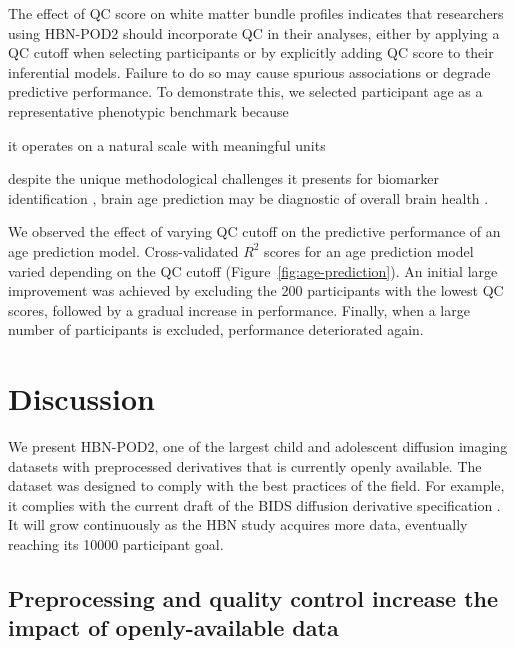 \documentclass[fleqn,10pt,inline]{wlscirep}
\begin{document}
The effect of QC score on white matter bundle profiles indicates that researchers
using HBN-POD2 should incorporate QC in their analyses, either by applying a QC cutoff
when selecting participants or by explicitly adding QC score to their inferential
models. Failure to do so may cause spurious associations or degrade predictive
performance. To demonstrate this, we selected participant age as a representative phenotypic benchmark because
\begin{enumerate*}[%
    label=(\roman*),%
    before=\unskip{ },%
    itemjoin={{, }},%
    itemjoin*={{ and }}]
    \item it operates on a natural scale with meaningful units
    \item despite the unique methodological challenges it presents for biomarker identification \cite{nelson2020biomarkers}, brain age prediction may be diagnostic of overall brain health \cite{franke2010estimating, cole2019brain, richie-halford2021multidimensional}.
\end{enumerate*}
We observed the effect of varying QC cutoff on the predictive performance of an age
prediction model. Cross-validated $R^2$ scores for an age prediction model
varied depending on the QC cutoff (Figure~\ref{fig:age-prediction}). An initial large improvement was achieved by excluding the 200 participants with the lowest QC scores, followed by a gradual increase in performance. Finally, when a large number of participants is excluded, performance deteriorated again.

\section*{Discussion}

We present HBN-POD2, one of the largest child and adolescent diffusion imaging
datasets with preprocessed derivatives that is currently openly available. The dataset
was designed to comply with the best practices of the field. For example, it
complies with the current draft of the BIDS diffusion derivative specification
\cite{Pestilli2021}. It will grow continuously as the HBN study acquires more
data, eventually reaching its \num{10000} participant goal. 

\subsection*{Preprocessing and quality control increase the impact of openly-available data}
\end{document}
